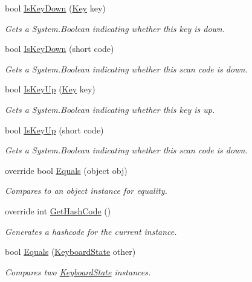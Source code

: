 \begin{DoxyCompactItemize}
\item 
bool \hyperlink{struct_open_t_k_1_1_input_1_1_keyboard_state_af465d03917b4415870d88e9c76aa8e9c}{Is\-Key\-Down} (\hyperlink{namespace_open_t_k_1_1_input_a30415d20dcc907a84693777cc0bdf1c7}{Key} key)
\begin{DoxyCompactList}\small\item\em Gets a System.\-Boolean indicating whether this key is down. \end{DoxyCompactList}\item 
bool \hyperlink{struct_open_t_k_1_1_input_1_1_keyboard_state_a50265eda3ea3e708ead82ed921248534}{Is\-Key\-Down} (short code)
\begin{DoxyCompactList}\small\item\em Gets a System.\-Boolean indicating whether this scan code is down. \end{DoxyCompactList}\item 
bool \hyperlink{struct_open_t_k_1_1_input_1_1_keyboard_state_ab9faa763d0612d0a656939173c4682fb}{Is\-Key\-Up} (\hyperlink{namespace_open_t_k_1_1_input_a30415d20dcc907a84693777cc0bdf1c7}{Key} key)
\begin{DoxyCompactList}\small\item\em Gets a System.\-Boolean indicating whether this key is up. \end{DoxyCompactList}\item 
bool \hyperlink{struct_open_t_k_1_1_input_1_1_keyboard_state_adb8b3beb1973f041c0c0cd618e426dd5}{Is\-Key\-Up} (short code)
\begin{DoxyCompactList}\small\item\em Gets a System.\-Boolean indicating whether this scan code is down. \end{DoxyCompactList}\item 
override bool \hyperlink{struct_open_t_k_1_1_input_1_1_keyboard_state_a1f7cc96814ce8ff75cf21e5b5ce18084}{Equals} (object obj)
\begin{DoxyCompactList}\small\item\em Compares to an object instance for equality. \end{DoxyCompactList}\item 
override int \hyperlink{struct_open_t_k_1_1_input_1_1_keyboard_state_aca706a349deade910c4036d83fd3b953}{Get\-Hash\-Code} ()
\begin{DoxyCompactList}\small\item\em Generates a hashcode for the current instance. \end{DoxyCompactList}\item 
bool \hyperlink{struct_open_t_k_1_1_input_1_1_keyboard_state_a23d088c31c8e586b72e8e7f56ae7519a}{Equals} (\hyperlink{struct_open_t_k_1_1_input_1_1_keyboard_state}{Keyboard\-State} other)
\begin{DoxyCompactList}\small\item\em Compares two \hyperlink{struct_open_t_k_1_1_input_1_1_keyboard_state}{Keyboard\-State} instances. \end{DoxyCompactList}\end{DoxyCompactItemize}
